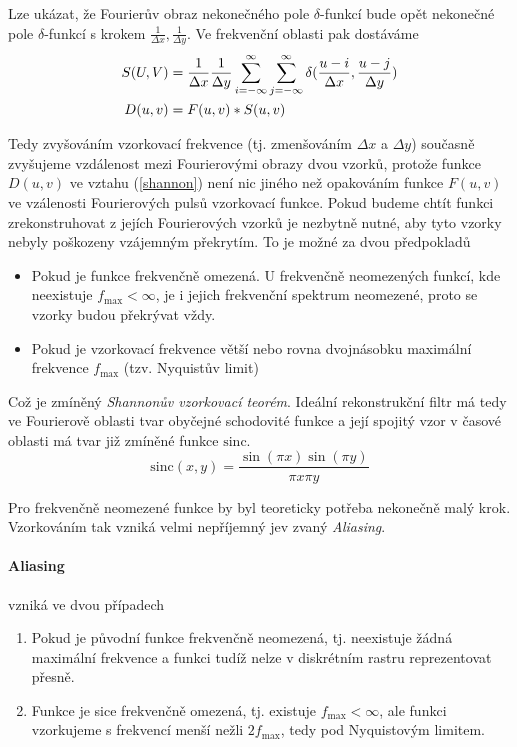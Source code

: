 Lze ukázat, že Fourierův obraz nekonečného pole $\delta$-funkcí bude opět nekonečné pole $\delta$-funkcí s krokem $\frac{1}{\Delta x},\frac{1}{\Delta y}$. Ve frekvenční oblasti pak dostáváme
\begin{align}
S(U,V) &= \frac{1}{\Delta x}\frac{1}{\Delta y}\sum\limits_{i=-\infty}^\infty\sum\limits_{j=-\infty}^\infty
\delta(\frac{u-i}{\Delta x},\frac{u-j}{\Delta y})\\
D(u,v) &= F(u,v)\ast S(u,v)\label{shannon}
\end{align}

Tedy zvyšováním vzorkovací frekvence (tj. zmenšováním $\Delta x$ a $\Delta y$) současně zvyšujeme vzdálenost mezi Fourierovými obrazy dvou vzorků, protože funkce $D(u,v)$ ve vztahu (\ref{shannon}) není nic jiného než opakováním funkce $F(u,v)$ ve vzálenosti Fourierových pulsů vzorkovací funkce. Pokud budeme chtít funkci zrekonstruhovat z jejích Fourierových vzorků je nezbytně nutné, aby tyto vzorky nebyly poškozeny vzájemným překrytím. To je možné za dvou předpokladů

\begin{itemize}
\item Pokud je funkce frekvenčně omezená. U frekvenčně neomezených funkcí, kde neexistuje $f_{\max}<\infty$, je i jejich
frekvenční spektrum neomezené, proto se vzorky budou překrývat vždy.
\item Pokud je vzorkovací frekvence větší nebo rovna dvojnásobku maximální frekvence $f_{\max}$ (tzv. Nyquistův limit)
\end{itemize}

 
Což je zmíněný \emph{Shannonův vzorkovací teorém}. Ideální rekonstrukční filtr má tedy ve Fourierově oblasti tvar obyčejné
schodovité funkce a její spojitý vzor v časové oblasti má tvar již zmíněné funkce $\mathrm{sinc}$.
\begin{equation}
\mathrm{sinc}(x,y)=\frac{\sin(\pi x)\sin(\pi y)}{\pi x \pi y}
\end{equation}

Pro frekvenčně neomezené funkce by byl teoreticky potřeba nekonečně malý krok. Vzorkováním tak vzniká velmi
nepříjemný jev zvaný \emph{Aliasing}.

\paragraph{Aliasing} vzniká ve dvou případech
\begin{enumerate}
\item Pokud je původní funkce frekvenčně neomezená, tj. neexistuje žádná maximální frekvence a funkci tudíž nelze v diskrétním
rastru reprezentovat přesně.
\item Funkce je sice frekvenčně omezená, tj. existuje $f_{\max}<\infty$, ale funkci vzorkujeme s frekvencí menší nežli
$2f_{\max}$, tedy pod Nyquistovým limitem.
\end{enumerate}

